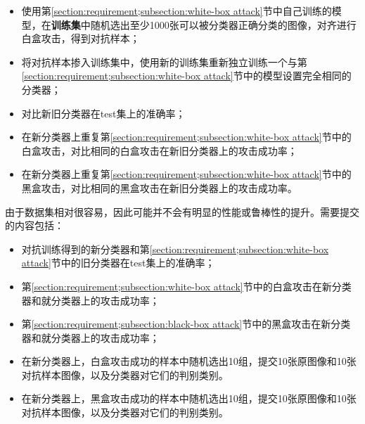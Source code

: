 \documentclass[journal, a4paper]{IEEEtran}
\begin{document}
\begin{itemize}
    \item 使用第\ref{section:requirement;subsection:white-box attack}节中自己训练的模型，在\textbf{训练集}中随机选出至少1000张可以被分类器正确分类的图像，对齐进行白盒攻击，得到对抗样本；
    \item 将对抗样本掺入训练集中，使用新的训练集重新独立训练一个与第\ref{section:requirement;subsection:white-box attack}节中的模型设置完全相同的分类器；
    \item 对比新旧分类器在test集上的准确率；
    \item 在新分类器上重复第\ref{section:requirement;subsection:white-box attack}节中的白盒攻击，对比相同的白盒攻击在新旧分类器上的攻击成功率；
    \item 在新分类器上重复第\ref{section:requirement;subsection:white-box attack}节中的黑盒攻击，对比相同的黑盒攻击在新旧分类器上的攻击成功率。
\end{itemize}

由于数据集相对很容易，因此可能并不会有明显的性能或鲁棒性的提升。需要提交的内容包括：

\begin{itemize}
    \item 对抗训练得到的新分类器和第\ref{section:requirement;subsection:white-box attack}节中的旧分类器在test集上的准确率；
    \item 第\ref{section:requirement;subsection:white-box attack}节中的白盒攻击在新分类器和就分类器上的攻击成功率；
    \item 第\ref{section:requirement;subsection:black-box attack}节中的黑盒攻击在新分类器和就分类器上的攻击成功率；
    \item 在新分类器上，白盒攻击成功的样本中随机选出10组，提交10张原图像和10张对抗样本图像，以及分类器对它们的判别类别。
    \item 在新分类器上，黑盒攻击成功的样本中随机选出10组，提交10张原图像和10张对抗样本图像，以及分类器对它们的判别类别。
\end{itemize}

\end{document}
